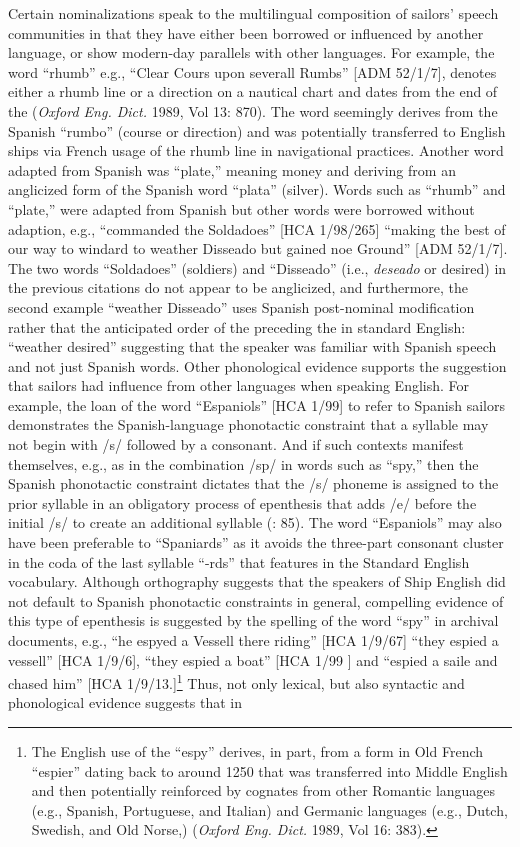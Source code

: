 Certain nominalizations speak to the multilingual composition of sailors’ speech communities in that they have either been borrowed or influenced by another language, or show modern-day parallels with other languages. For example, the word “rhumb” e.g., “Clear Cours upon severall Rumbs” [ADM 52/1/7], denotes either a rhumb line or a direction on a nautical chart and dates from the end of the  (\textit{Oxford Eng. Dict.} 1989, Vol 13: 870). The word seemingly derives from the Spanish “rumbo” (course or direction) and was potentially transferred to English ships via French usage of the rhumb line in navigational practices. Another word adapted from Spanish was “plate,” meaning money and deriving from an anglicized form of the Spanish word “plata” (silver). Words such as “rhumb” and “plate,” were adapted from Spanish but other words were borrowed without adaption, e.g., “commanded the Soldadoes” [HCA 1/98/265] “making the best of our way to windard to weather Disseado but gained noe Ground” [ADM 52/1/7]. The two words “Soldadoes” (soldiers) and “Disseado” (i.e., \textit{deseado} or desired) in the previous citations do not appear to be anglicized, and furthermore, the second example “weather Disseado” uses Spanish post-nominal modification rather that the anticipated order of the  preceding the  in standard English: “weather desired” suggesting that the speaker was familiar with Spanish speech and not just Spanish words. Other phonological evidence supports the suggestion that sailors had influence from other languages when speaking English. For example, the loan of the word “Espaniols” [HCA 1/99] to refer to Spanish sailors demonstrates the Spanish-language phonotactic constraint that a syllable may not begin with /s/ followed by a consonant. And if such contexts manifest themselves, e.g., as in the combination /sp/ in words such as “spy,” then the Spanish phonotactic constraint dictates that the /s/ phoneme is assigned to the prior syllable in an obligatory process of epenthesis that adds /e/ before the initial /s/ to create an additional syllable (\citealt{Schnitzer1997}: 85). The word “Espaniols” may also have been preferable to “Spaniards” as it avoids the three-part consonant cluster in the coda of the last syllable “-rds” that features in the Standard English vocabulary. Although orthography suggests that the speakers of Ship English did not default to Spanish phonotactic constraints in general, compelling evidence of this type of epenthesis is suggested by the spelling of the word “spy” in archival documents, e.g., “he espyed a Vessell there riding” [HCA 1/9/67] “they espied a vessell” [HCA 1/9/6], “they espied a boat” [HCA 1/99  \citealt{Islands1722}] and “espied a saile and chased him” [HCA 1/9/13.]\footnote{The English use of the  “espy” derives, in part, from a  form in Old French “espier” dating back to around 1250 that was transferred into Middle English and then potentially reinforced by cognates from other Romantic languages (e.g., Spanish, Portuguese, and Italian) and Germanic languages (e.g., Dutch, Swedish, and Old Norse,) (\textit{Oxford Eng. Dict.} 1989, Vol 16: 383).} Thus, not only lexical, but also syntactic and phonological evidence suggests that  in 